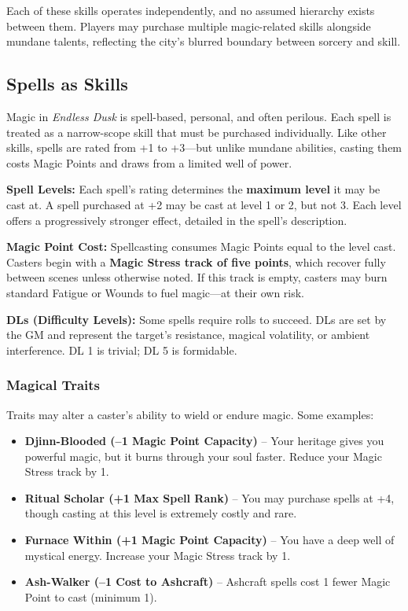 Each of these skills operates independently, and no assumed hierarchy exists between them. Players may purchase multiple magic-related skills alongside mundane talents, reflecting the city's blurred boundary between sorcery and skill.

\subsection{Spells as Skills}

Magic in \textit{Endless Dusk} is spell-based, personal, and often perilous. Each spell is treated as a narrow-scope skill that must be purchased individually. Like other skills, spells are rated from +1 to +3—but unlike mundane abilities, casting them costs Magic Points and draws from a limited well of power.

\vspace{0.5\baselineskip}
\textbf{Spell Levels:} Each spell’s rating determines the \textbf{maximum level} it may be cast at. A spell purchased at +2 may be cast at level 1 or 2, but not 3. Each level offers a progressively stronger effect, detailed in the spell’s description.

\vspace{0.5\baselineskip}
\textbf{Magic Point Cost:} Spellcasting consumes Magic Points equal to the level cast. Casters begin with a \textbf{Magic Stress track of five points}, which recover fully between scenes unless otherwise noted. If this track is empty, casters may burn standard Fatigue or Wounds to fuel magic—at their own risk.

\vspace{0.5\baselineskip}
\textbf{DLs (Difficulty Levels):} Some spells require rolls to succeed. DLs are set by the GM and represent the target’s resistance, magical volatility, or ambient interference. DL 1 is trivial; DL 5 is formidable.

\subsubsection*{Magical Traits}

Traits may alter a caster’s ability to wield or endure magic. Some examples:

\begin{itemize}\raggedright
    \item \textbf{Djinn-Blooded (–1 Magic Point Capacity)} – Your heritage gives you powerful magic, but it burns through your soul faster. Reduce your Magic Stress track by 1.
    \item \textbf{Ritual Scholar (+1 Max Spell Rank)} – You may purchase spells at +4, though casting at this level is extremely costly and rare.
    \item \textbf{Furnace Within (+1 Magic Point Capacity)} – You have a deep well of mystical energy. Increase your Magic Stress track by 1.
    \item \textbf{Ash-Walker (–1 Cost to Ashcraft)} – Ashcraft spells cost 1 fewer Magic Point to cast (minimum 1).
\end{itemize}

